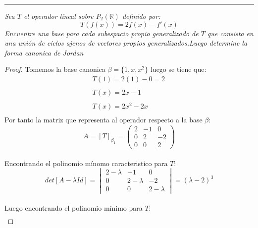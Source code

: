 \documentclass[11pt]{article}
\newcommand{\R}{\mathbb{R}}
\begin{document}
\rule{17cm}{0.1mm}

\begin{tcolorbox}[title = \textcolor{black}{\textcolor{white}{Problema 1}}]
\textit{Sea $T$ el operador l\'ineal sobre $P_2(\R)$ definido por:\,\\
\begin{equation*}
    T(f(x))=2f(x)-f'(x)
\end{equation*}
Encuentre una base para cada subespacio propio generalizado de $T$ que consista en una uni\'on de ciclos ajenos de vectores propios generalizados.Luego determine la forma canonica de Jordan }
\end{tcolorbox}
\begin{proof}
    Tomemos la base canonica $\beta=\{1,x,x^2\}$ luego se tiene que:\,\\
    \begin{align*}
        T(1)=2(1)-0=2\,\\
        \\
        T(x)=2x-1\,\\
        \\
        T(x)=2x^2-2x\,\\
    \end{align*}
    Por tanto la matriz que representa al operador respecto a la base $\beta$:\,\\
    \begin{equation*}
       A=[T]_{\beta_1}=\begin{pmatrix}
            2&-1&0\\
            0&2&-2\\
            0&0&2
        \end{pmatrix}
    \end{equation*}
    \,\\
    Encontrando el polinomio m\'inomo caracteristico para $T$:\,\\
    \begin{equation*}
        det[A-\lambda Id]=\begin{vmatrix}
            2-\lambda&-1&0\\
            0&2-\lambda&-2\\
            0&0&2-\lambda
        \end{vmatrix}=(\lambda-2)^3
    \end{equation*}\,\\
    Luego encontrando el polinomio m\'inimo para $T$:\,\\
    \begin{align*}

\end{align*}
\end{proof}
\end{document}
